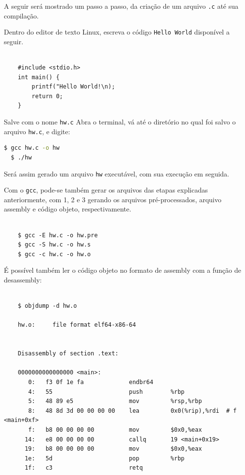 A seguir será mostrado um passo a passo, da criação de um arquivo
\texttt{.c} até sua compilação.

Dentro do editor de texto Linux, escreva o código \texttt{Hello\ World}
disponível a seguir.

\begin{verbatim}

    #include <stdio.h>
    int main() { 
        printf("Hello World!\n); 
        return 0; 
    }

\end{verbatim}



Salve com o nome \texttt{hw.c} Abra o terminal, vá até o diretório no
qual foi salvo o arquivo \texttt{hw.c}, e digite:


\begin{lstlisting}[language=bash]
  $ gcc hw.c -o hw
  $ ./hw
\end{lstlisting}





Será assim gerado um arquivo \texttt{hw} executável, com sua execução em
seguida.

Com o \texttt{gcc}, pode-se também gerar os arquivos das etapas
explicadas anteriormente, com 1, 2 e 3 gerando os arquivos
pré-processados, arquivo assembly e código objeto, respectivamente.





\begin{verbatim}

    $ gcc -E hw.c -o hw.pre
    $ gcc -S hw.c -o hw.s
    $ gcc -c hw.c -o hw.o
\end{verbatim}



É possível também ler o código objeto no formato de assembly com a
função de desassembly:

\begin{verbatim}

    $ objdump -d hw.o
    
    hw.o:     file format elf64-x86-64
    
    
    Disassembly of section .text:
    
    0000000000000000 <main>:
       0:   f3 0f 1e fa             endbr64
       4:   55                      push        %rbp
       5:   48 89 e5                mov         %rsp,%rbp
       8:   48 8d 3d 00 00 00 00    lea         0x0(%rip),%rdi  # f <main+0xf>
       f:   b8 00 00 00 00          mov         $0x0,%eax
      14:   e8 00 00 00 00          callq       19 <main+0x19>
      19:   b8 00 00 00 00          mov         $0x0,%eax
      1e:   5d                      pop         %rbp
      1f:   c3                      retq
\end{verbatim}


